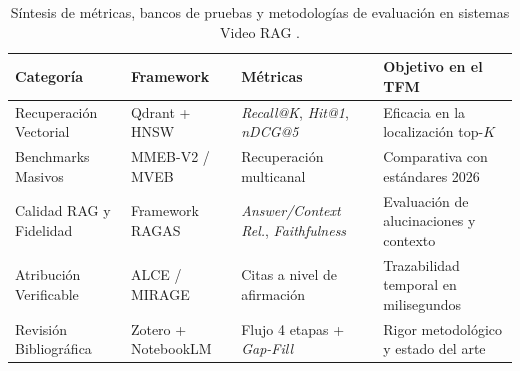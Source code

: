 \begin{table}[htbp]
\centering
\small
\setlength{\tabcolsep}{4.5pt}
\caption{Síntesis de métricas, bancos de pruebas y metodologías de evaluación en sistemas Video RAG \cite{qwen3_vl_emb2026, eval_mrag2025, video_rac2025, easton2026notebooklm}.} %
\label{tab:resumen_metodologia_evaluacion}
\begin{tabularx}{\linewidth}{>{\raggedright\arraybackslash}p{3.4cm} >{\raggedright\arraybackslash}p{3.2cm} >{\raggedright\arraybackslash}p{3.8cm} >{\raggedright\arraybackslash}X}
\toprule
\textbf{Categoría} & \textbf{Framework} & \textbf{Métricas} & \textbf{Objetivo en el TFM} \\
\midrule
Recuperación Vectorial & Qdrant + HNSW & \textit{Recall@K}, \textit{Hit@1}, \textit{nDCG@5} & Eficacia en la localización top-$K$ \\
Benchmarks Masivos & MMEB-V2 / MVEB & Recuperación multicanal & Comparativa con estándares 2026 \\
Calidad RAG y Fidelidad & Framework RAGAS & \textit{Answer/Context Rel.}, \textit{Faithfulness} & Evaluación de alucinaciones y contexto \\
Atribución Verificable & ALCE / MIRAGE & Citas a nivel de afirmación & Trazabilidad temporal en milisegundos \\
Revisión Bibliográfica & Zotero + NotebookLM & Flujo 4 etapas + \textit{Gap-Fill} & Rigor metodológico y estado del arte \\
\bottomrule
\end{tabularx}
\end{table}